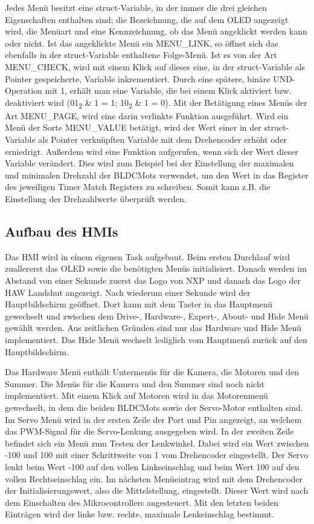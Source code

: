 Jedes Menü besitzt eine \glqq struct\grqq{}-Variable, in der immer die drei gleichen Eigenschaften enthalten sind; die Bezeichnung, die auf dem \ac{OLED} angezeigt wird, die Menüart und eine Kennzeichnung, ob das Menü angeklickt werden kann oder nicht. Ist das angeklickte Menü ein MENU\_LINK, so öffnet sich das ebenfalls in der \glqq struct\grqq{}-Variable enthaltene Folge-Menü. Ist es von der Art MENU\_CHECK, wird mit einem Klick auf dieses eine, in der \glqq struct\grqq{}-Variable als Pointer gespeicherte, Variable inkrementiert. Durch eine spätere, binäre UND-Operation mit 1, erhält man eine Variable, die bei einem Klick aktiviert bzw. deaktiviert wird (01\textsubscript{2} \& 1 = 1; 10\textsubscript{2} \& 1 = 0). Mit der Betätigung eines Menüs der Art MENU\_PAGE, wird eine darin verlinkte Funktion ausgeführt. Wird ein Menü der Sorte MENU\_VALUE betätigt, wird der Wert einer in der \glqq struct\grqq{}-Variable als Pointer verknüpften Variable mit dem Drehencoder erhöht oder erniedrigt. Außerdem wird eine Funktion aufgerufen, wenn sich der Wert dieser Variable verändert. Dies wird zum Beispiel bei der Einstellung der maximalen und minimalen Drehzahl der \acp{BLDCMot} verwendet, um den Wert in das Register des jeweiligen Timer Match Registers zu schreiben. Somit kann z.B. die Einstellung der Drehzahlwerte überprüft werden.

\subsection{Aufbau des \aclp{HMI}}
Das \ac{HMI} wird in einem eigenen Task aufgebaut. Beim ersten Durchlauf wird zuallererst das \ac{OLED} sowie die benötigten Menüs initialisiert. Danach werden im Abstand von einer Sekunde zuerst das Logo von \ac{NXP} und danach das Logo der HAW Landshut angezeigt. Nach wiederum einer Sekunde wird der Hauptbildschirm geöffnet. Dort kann mit dem Taster in das Hauptmenü gewechselt und zwischen dem Drive-, Hardware-, Expert-, About- und Hide Menü gewählt werden. Aus zeitlichen Gründen sind nur das Hardware und Hide Menü implementiert. Das Hide Menü wechselt lediglich vom Hauptmenü zurück auf den Hauptbildschirm.\vspace{11pt} 

Das Hardware Menü enthält Untermenüs für die Kamera, die Motoren und den Summer. Die Menüs für die Kamera und den Summer sind noch nicht implementiert. Mit einem Klick auf Motoren wird in das Motorenmenü gewechselt, in dem die beiden \acp{BLDCMot} sowie der Servo-Motor enthalten sind. Im Servo Menü wird in der ersten Zeile der Port und Pin angezeigt, an welchem das \ac{PWM}-Signal für die Servo-Lenkung ausgegeben wird. In der zweiten Zeile befindet sich ein Menü zum Testen der Lenkwinkel. Dabei wird ein Wert zwischen -100 und 100 mit einer Schrittweite von 1 vom Drehencoder eingestellt. Der Servo lenkt beim Wert -100 auf den vollen Linkseinschlag und beim Wert 100 auf den vollen Rechtseinschlag ein. Im nächsten Menüeintrag wird mit dem Drehencoder der Initialisierungswert, also die Mittelstellung, eingestellt. Dieser Wert wird nach dem Einschalten des Mikrocontrollers angesteuert. Mit den letzten beiden Einträgen wird der linke bzw. rechte, maximale Lenkeinschlag bestimmt.\vspace{11pt}

